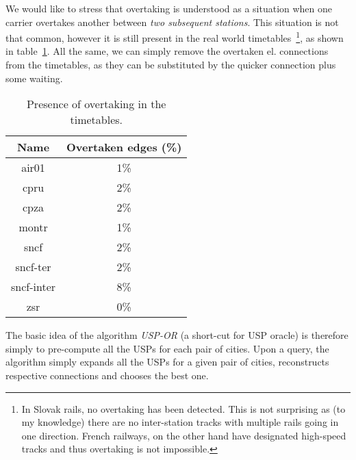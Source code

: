     \noindent We would like to stress that overtaking is understood as a situation when one carrier overtakes another between \textit{two subsequent stations}. This situation is not that common, however it is still present in the real world timetables~\footnote{In Slovak rails, no overtaking has been detected. This is not surprising as (to my knowledge) there are no inter-station tracks with multiple rails going in one direction. French railways, on the other hand have designated high-speed tracks and thus overtaking is not impossible.}, as shown in table~\ref{tab:overtake}. All the same, we can simply remove the overtaken el. connections from the timetables, as they can be substituted by the quicker connection plus some waiting. \\
    
    \begin{table}[h!]
    	\centering
		\begin{tabular}{c|c}
            \rowcolor{tablehead}
        	\textbf{Name} & \textbf{Overtaken edges (\%)} \\
			\hline
			air01 & 1\% \\
			cpru & 2\% \\
			cpza & 2\% \\
			montr & 1\% \\
			sncf & 2\% \\
			sncf-ter & 2\% \\
			sncf-inter & 8\% \\
			zsr & 0\% \\
		\end{tabular}
		\caption{\label{tab:overtake} Presence of overtaking in the timetables.}
	\end{table}
	
	\noindent The basic idea of the algorithm \textit{USP-OR} (a short-cut for USP oracle) is therefore simply to pre-compute all the USPs for each pair of cities. Upon a query, the algorithm simply expands all the USPs for a given pair of cities, reconstructs respective connections and chooses the best one. \\
	
